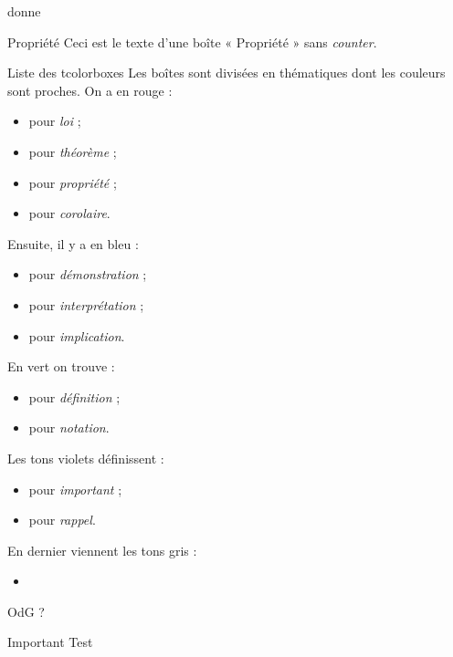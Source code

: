\documentclass[10pt,a5paper,notitlepage]{book}
\begin{document}
donne

\begin{NCprop}{Propriété}
    Ceci est le texte d'une boîte « Propriété » sans \textit{counter}.
\end{NCprop}

\begin{NCdefi}{Liste des tcolorboxes}
    Les boîtes sont divisées en thématiques dont les couleurs sont proches. On a
    en rouge :
    \begin{itemize}
        \item {} pour \textit{loi} ; 
        \item {} pour \textit{théorème} ;
        \item {} pour \textit{propriété} ;
        \item {} pour \textit{corolaire}.
    \end{itemize}
    Ensuite, il y a en bleu :
    \begin{itemize}
        \item {} pour \textit{démonstration} ;
        \item {} pour \textit{interprétation} ;
        \item {} pour \textit{implication}.
    \end{itemize}
    En vert on trouve :
    \begin{itemize}
        \item {} pour \textit{définition} ;
        \item {} pour \textit{notation}.
    \end{itemize}
    Les tons violets définissent :
    \begin{itemize}
        \item {} pour \textit{important} ;
        \item {} pour \textit{rappel}.
    \end{itemize}
    En dernier viennent les tons gris :
    \begin{itemize}
        \item 
    \end{itemize}
\end{NCdefi}

\begin{odgr}{OdG}
    ?
\end{odgr}

\begin{NCimpo}{Important}
    Test
\end{NCimpo}
\end{document}
